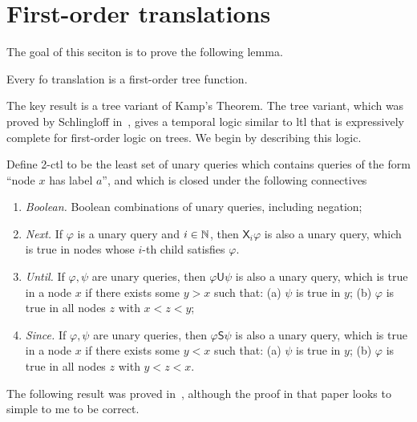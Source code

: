 \section{First-order translations}\label{sec:fo-translation}

The goal of this seciton is to prove the following lemma.
\begin{lemma}\label{lem:fo-translation} Every fo translation is a first-order tree function.
\end{lemma}

 The key result is a tree variant of Kamp's Theorem. The tree variant, which was proved by Schlingloff in~\cite{schlingloff1992expressive}, gives a temporal logic similar to {\sc ltl} that is expressively complete for first-order logic on trees. We begin by describing this logic.


\newcommand{\nextmod}{\mathsf X}
\newcommand{\untilmod}{\mathsf U}
\newcommand{\sincemod}{\mathsf S}


\begin{definition}[2-ctl]
    Define 2-ctl to be the least set of unary queries which contains queries of the form ``node $x$ has label $a$'', and which is closed under the following connectives
    \begin{enumerate}
        \item \emph{Boolean.} Boolean combinations of unary queries, including negation;
        \item \emph{Next.} If $\varphi$ is a unary query and $i \in {\mathbb N}$, then  $\nextmod_i \varphi$ is also a unary query, which is true in nodes whose $i$-th child satisfies $\varphi$.
         \item \emph{Until.} If $\varphi,\psi$ are  unary queries, then  $\varphi \untilmod \psi$ is also a unary query, which is true in a node $x$ if there exists some $y > x$ such that: (a) $\psi$ is true in $y$; (b) $\varphi$ is true in all nodes $z$ with $x < z < y$;
         \item \emph{Since.} If $\varphi,\psi$ are  unary queries, then  $\varphi \sincemod \psi$ is also a unary query, which is true in a node $x$ if there exists some $y < x$ such that: (a) $\psi$ is true in $y$; (b) $\varphi$ is true in all nodes $z$ with $y < z < x$.
    \end{enumerate}
\end{definition}

The following result was proved in~\cite[Theorem 2.6]{schlingloff1992expressive}, although the proof in that paper looks to simple to me to be correct.

